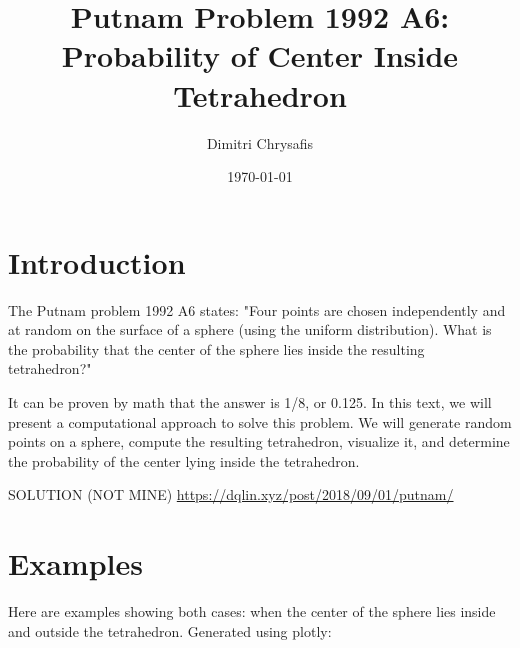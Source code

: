 \documentclass{article}
\title{Putnam Problem 1992 A6: Probability of Center Inside Tetrahedron}
\author{Dimitri Chrysafis}
\date{\today}
\begin{document}
\maketitle

\section{Introduction}
The Putnam problem 1992 A6 states: "Four points are chosen independently and at random on the surface of a sphere (using the uniform distribution). What is the probability that the center of the sphere lies inside the resulting tetrahedron?"

It can be proven by math that the answer is 1/8, or 0.125. In this text, we will present a computational approach to solve this problem. We will generate random points on a sphere, compute the resulting tetrahedron, visualize it, and determine the probability of the center lying inside the tetrahedron.

SOLUTION (NOT MINE) \href{https://dqlin.xyz/post/2018/09/01/putnam/}{https://dqlin.xyz/post/2018/09/01/putnam/}
\section{Examples}
Here are examples showing both cases: when the center of the sphere lies inside and outside the tetrahedron. Generated using plotly:
\end{document}

